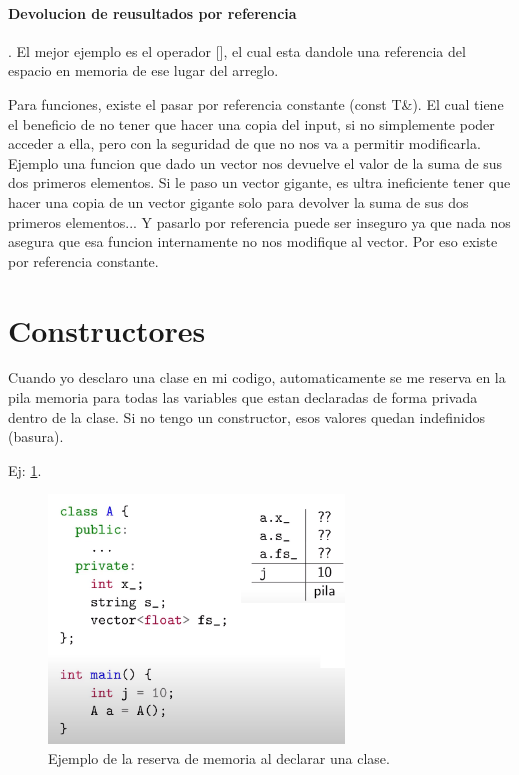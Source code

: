 \documentclass[11pt]{article}
\begin{document}
\paragraph{Devolucion de reusultados por referencia}.
El mejor ejemplo es el operador [], el cual esta dandole una referencia
del espacio en memoria de ese lugar del arreglo.
\vspace{0.5cm}

Para funciones, existe el pasar por referencia constante (const T\&).
El cual tiene el beneficio de no tener que hacer una copia del input, si no simplemente
poder acceder a ella, pero con la seguridad de que no nos va a permitir modificarla.
Ejemplo una funcion que dado un vector nos devuelve el valor de la suma de sus dos primeros
elementos.
Si le paso un vector gigante, es ultra ineficiente tener que hacer una copia de un
vector gigante solo para devolver la suma de sus dos primeros elementos...
Y pasarlo por referencia puede ser inseguro ya que nada nos asegura que esa funcion
internamente no nos modifique al vector.
Por eso existe por referencia constante.

\section{Constructores}
Cuando yo desclaro una clase en mi codigo, automaticamente se me reserva en la pila
memoria para todas las variables que estan declaradas de forma privada dentro de
la clase.
Si no tengo un constructor, esos valores quedan indefinidos (basura).

Ej: \ref{fig:const}.
\begin{figure}[h!]
    \centering
    \includegraphics[width=0.7\textwidth]{constructor.png}
    \caption{Ejemplo de la reserva de memoria al declarar una clase.}
    \label{fig:const}
\end{figure}
\end{document}
